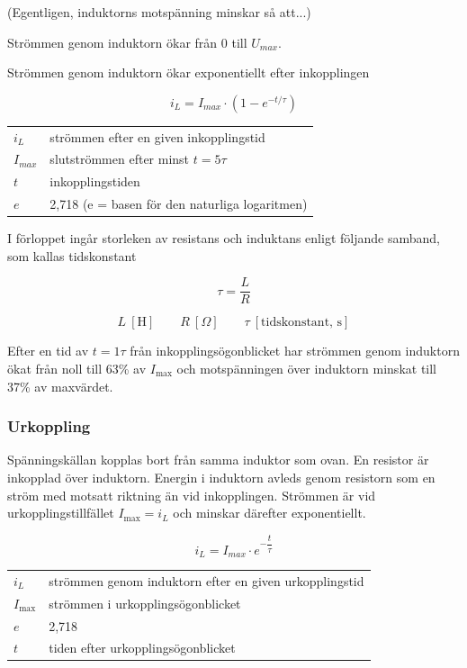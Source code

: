 (Egentligen, induktorns motspänning minskar så att...)

Strömmen genom induktorn ökar från 0 till \(U_{max}\).

Strömmen genom induktorn ökar exponentiellt efter inkopplingen

\[ i_L = I_{max} \cdot (1-e^{-t/\tau} )\]

\begin{tabular}{lp{}}
  \(i_L\) &  strömmen efter en given inkopplingstid \\
  \(I_{max}\) & slutströmmen efter minst \(t = 5\tau\) \\
  \(t\) & inkopplingstiden \\
  \(e\) & 2,718 (e = basen för den naturliga logaritmen) \\
\end{tabular}

I förloppet ingår storleken av resistans och induktans enligt följande samband,
som kallas tidskonstant

\[ \tau = \frac{L}{R} \]

\[
L\ [\text{H}] \qquad
R\ [\Omega] \qquad
\tau\ [\text{tidskonstant, s}]
\]

Efter en tid av \(t = 1\tau\) från inkopplingsögonblicket har strömmen genom
induktorn ökat från noll till 63\% av \(I_{\text{max}}\) och motspänningen över
induktorn minskat till 37\% av maxvärdet.

\subsubsection{Urkoppling}

Spänningskällan kopplas bort från samma induktor som ovan.
En resistor är inkopplad över induktorn.
Energin i induktorn avleds genom resistorn som en ström med motsatt riktning
än vid inkopplingen.
Strömmen är vid urkopplingstillfället \(I_\text{{max}} = i_L\) och minskar 
därefter exponentiellt.

\[i_L = I_{max} \cdot e^{-\dfrac{t}{\tau}}\]

\begin{tabular}{ll}
	\(i_L\)            & strömmen genom induktorn efter en given urkopplingstid 
	\\
	\(I_\text{{max}}\) & strömmen i urkopplingsögonblicket                      
	\\
	\(e\)              & 2,718                                                  
	\\
	\(t\)              & tiden efter urkopplingsögonblicket
\end{tabular}

